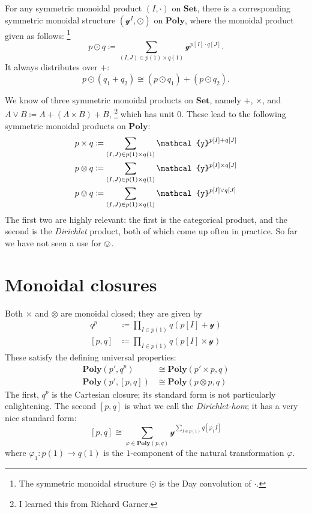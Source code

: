 \documentclass[11pt, one side, article]{memoir}
\theoremstyle{definition}
\theoremstyle{plain}
\newcommand{\Cat}[1]{\mathbf{#1}}%
\newcommand{\smset}{\Cat{Set}}
\newcommand{\yon}{\mathcal{y}}
\newcommand{\poly}{\Cat{Poly}}
\newcommand{\0}{\textsf{0}}
\newcommand{\1}{\tn{\textsf{1}}}
\begin{document}
For any symmetric monoidal product $(I,\cdot)$ on $\smset$, there is a corresponding symmetric monoidal structure $(\yon^I,\odot)$ on $\poly$, where the monoidal product given as follows:%
\footnote{The symmetric monoidal structure $\odot$ is the Day convolution of $\cdot$.}
\begin{equation}
p\odot q\coloneqq\sum_{(I,J)\in p(1)\times q(1)}\yon^{p[I]\cdot q[J]}.
\end{equation}
It always distributes over $+$:
\begin{equation}
p\odot(q_1+q_2)\cong (p\odot q_1)+(p\odot q_2).
\end{equation}

We know of three symmetric monoidal products on $\smset$, namely $+$, $\times$, and $A\vee B\coloneqq A+(A\times B)+B$,%
\footnote{I learned this from Richard Garner.}
which has unit $0$. These lead to the following symmetric monoidal products on $\poly$:
\begin{align}
	p\times q&\coloneqq\sum_{(I,J)\in p(1)\times q(1)}\yon^{p[I]+ q[J]}\\
	p\otimes q&\coloneqq\sum_{(I,J)\in p(1)\times q(1)}\yon^{p[I]\times q[J]}\\
	p\ovee q&\coloneqq\sum_{(I,J)\in p(1)\times q(1)}\yon^{p[I]\vee q[J]}
\end{align}
The first two are highly relevant: the first is the categorical product, and the second is the \emph{Dirichlet} product, both of which come up often in practice. So far we have not seen a use for $\ovee$.

\chapter{Monoidal closures}

Both $\times$ and $\otimes$ are monoidal closed; they are given by
\begin{align}
  q^p&\coloneqq \prod_{I\in p(1)}q(p[I]+\yon)\\
  [p,q]&\coloneqq\prod_{I\in p(1)}q(p[I]\times\yon)
\end{align}
These satisfy the defining universal properties:
\begin{align}
  \poly(p',q^p)&\cong\poly(p'\times p,q)\\
  \poly(p',[p,q])&\cong\poly(p\otimes p,q)
\end{align}
The first, $q^p$ is the Cartesian closure; its standard form is not particularly enlightening. The second $[p,q]$ is what we call the \emph{Dirichlet-hom}; it has a very nice standard form:
\[
[p,q]\cong\sum_{\varphi\in\poly(p,q)}\yon^{\sum\limits_{I\in p(1)}q[\varphi_1I]}
\]
where $\varphi_1\colon p(1)\to q(1)$ is the $1$-component of the natural transformation $\varphi$.
\end{document}
